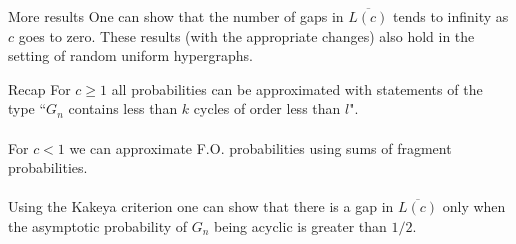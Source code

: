 \documentclass[handout, 11pt]{beamer}
\begin{document}
\begin{frame}{More results}
	One can show that the number of gaps in $\overline{L(c)}$
	tends to infinity as $c$ goes to zero.
	\vfill
	These results (with the appropriate changes) also hold in the setting of random uniform
	hypergraphs.  
\end{frame}

\begin{frame}{Recap}
	For $c\geq 1$ all probabilities can be approximated with statements of the type ``$G_n$ contains less than $k$ cycles of order less than $l$".\\~\\
	For $c<1$ we can approximate F.O. probabilities using sums of fragment
	probabilities. \\~\\
	Using the Kakeya criterion one can show that there is a gap in
	$\overline{L(c)}$ only when the asymptotic probability of $G_n$ being acyclic is 
	greater than $1/2$.
	
\end{frame}
\end{document}
